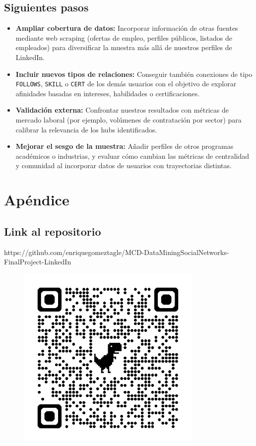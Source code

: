 \documentclass[10pt]{article}
\begin{document}
\subsection{Siguientes pasos}
\begin{itemize}
	\item \textbf{Ampliar cobertura de datos:} Incorporar información de otras fuentes mediante web scraping (ofertas de empleo, perfiles públicos, listados de empleados) para diversificar la muestra más allá de nuestros perfiles de LinkedIn.
	\item \textbf{Incluir nuevos tipos de relaciones:} Conseguir también conexiones de tipo \texttt{FOLLOWS}, \texttt{SKILL} o \texttt{CERT} de los demás usuarios con el objetivo de explorar afinidades basadas en intereses, habilidades o certificaciones.
	\item \textbf{Validación externa:} Confrontar nuestros resultados con métricas de mercado laboral (por ejemplo, volúmenes de contratación por sector) para calibrar la relevancia de los hubs identificados.
	\item \textbf{Mejorar el sesgo de la muestra:} Añadir perfiles de otros programas académicos o industrias, y evaluar cómo cambian las métricas de centralidad y comunidad al incorporar datos de usuarios con trayectorias distintas.
\end{itemize}
\appendix

\section{Apéndice}

\subsection*{Link al repositorio}
https://github.com/enriquegomeztagle/MCD-DataMiningSocialNetworks-FinalProject-LinkedIn

\begin{figure}[H]
	\centering
	\includegraphics[width=0.8\textwidth]{images/qrcode_github-repo.png}
\end{figure}
\end{document}
